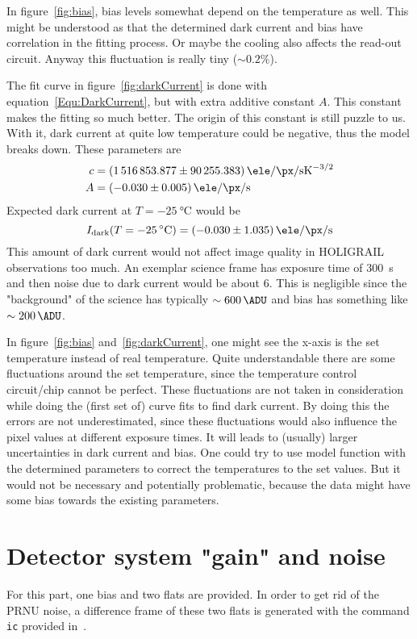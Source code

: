 In figure~\ref{fig:bias}, bias levels somewhat depend on the temperature as well. This might be understood as that the determined dark current and bias have correlation in the fitting process. Or maybe the cooling also affects the read-out circuit. Anyway this fluctuation is really tiny ($\sim 0.2\%$).

The fit curve in figure~\ref{fig:darkCurrent} is done with equation~\ref{Equ:DarkCurrent}, but with extra additive constant $A$. This constant makes the fitting so much better. The origin of this constant is still puzzle to us. With it, dark current at quite low temperature could be negative, thus the model breaks down. These parameters are
\begin{align*}
	c &= \SI{1516853.877 +- 90255.383}{\ele\per\px\per\s\kelvin\tothe{-3/2}} \\
	A &= \SI{-0.030 +- 0.005}{\ele\per\px\per\s}
\end{align*}
Expected dark current at $T=\SI{-25}{\degreeCelsius}$ would be
\begin{equation*}
	I_\text{dark} (T = \SI{-25}{\degreeCelsius}) = \SI{-0.030 +- 1.035}{\ele\per\px\per\s}
\end{equation*}
This amount of dark current would not affect image quality in HOLIGRAIL observations too much. An exemplar science frame has exposure time of \SI{300}{\s} and then noise due to dark current would be about \SI{6}{\ADU}. This is negligible since the "background" of the science has typically $\sim \SI{600}{\ADU}$ and bias has something like $\sim \SI{200}{\ADU}$.

In figure~\ref{fig:bias} and~\ref{fig:darkCurrent}, one might see the x-axis is the set temperature instead of real temperature. Quite understandable there are some fluctuations around the set temperature, since the temperature control circuit/chip cannot be perfect. These fluctuations are not taken in consideration while doing the (first set of) curve fits to find dark current. By doing this the errors are not underestimated, since these fluctuations would also influence the pixel values at different exposure times. It will leads to (usually) larger uncertainties in dark current and bias. One could try to use model function with the determined parameters to correct the temperatures to the set values. But it would not be necessary and potentially problematic, because the data might have some bias towards the existing parameters.

\section{Detector system "gain" and noise}\label{sec:gain}
For this part, one bias and two flats are provided. In order to get rid of the PRNU noise, a difference frame of these two flats is generated with the command \verb|ic| provided in~\cite{manual}.

